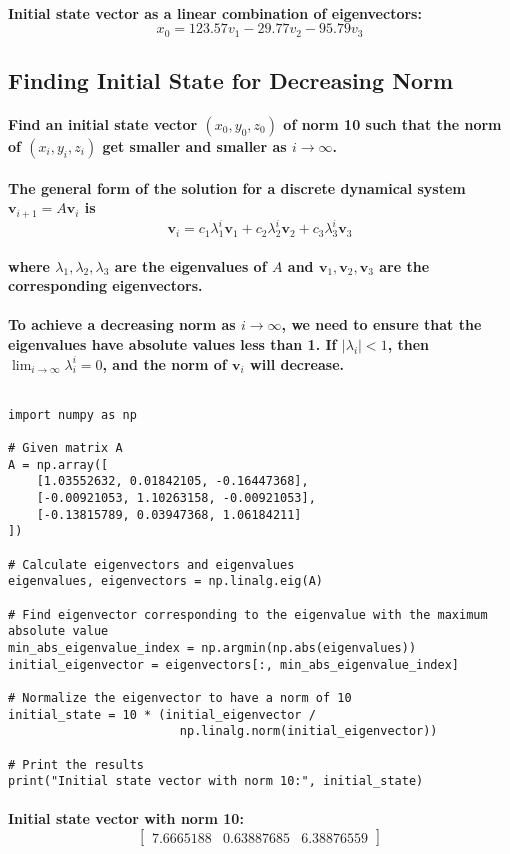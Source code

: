 \paragraph{\textbf{Initial state vector as a linear combination of eigenvectors:}$$ x_0 = 123.57 v_1 -29.77 v_2  -95.79 v_3 $$}
% 
% 
% 
% 
% 
% 
% 
% 
\subsection{Finding Initial State for Decreasing Norm}
\paragraph{Find an initial state vector $(x_0,y_0,z_0)$ of norm 10 such that the norm of $(x_i,y_i,z_i)$ get smaller and smaller as $i \rightarrow \infty$.}
% 
% 
% 
% 
\paragraph{The general form of the solution for a discrete dynamical system $\mathbf{v}_{i+1} = A \mathbf{v}_i $  is
    $$ \mathbf{v}_i = c_1 \lambda_1^i \mathbf{v}_1 + c_2 \lambda_2^i \mathbf{v}_2 + c_3 \lambda_3^i \mathbf{v}_3 $$}
% 
% 
%
% 
% 
\paragraph{where $ \lambda_1, \lambda_2, \lambda_3 $ are the eigenvalues of \(A\) and \(\mathbf{v}_1, \mathbf{v}_2, \mathbf{v}_3\) are the corresponding eigenvectors.}
% 
% 
% 
%
\paragraph{To achieve a decreasing norm as \(i \rightarrow \infty\), we need to ensure that the eigenvalues have absolute values less than 1. If \(|\lambda_i| < 1\), then \(\lim_{i \to \infty} \lambda_i^i = 0\), and the norm of \(\mathbf{v}_i\) will decrease.}
% 
% 
% 
%
$$$$
% 
% 
% 
% 
\begin{lstlisting}[style=pystyle]
import numpy as np

# Given matrix A
A = np.array([
    [1.03552632, 0.01842105, -0.16447368],
    [-0.00921053, 1.10263158, -0.00921053],
    [-0.13815789, 0.03947368, 1.06184211]
])

# Calculate eigenvectors and eigenvalues
eigenvalues, eigenvectors = np.linalg.eig(A)

# Find eigenvector corresponding to the eigenvalue with the maximum absolute value
min_abs_eigenvalue_index = np.argmin(np.abs(eigenvalues))
initial_eigenvector = eigenvectors[:, min_abs_eigenvalue_index]

# Normalize the eigenvector to have a norm of 10
initial_state = 10 * (initial_eigenvector /
                        np.linalg.norm(initial_eigenvector))

# Print the results
print("Initial state vector with norm 10:", initial_state)

\end{lstlisting}
% 
% 
% 
%
% 
% 
% 
%
\paragraph{\textbf{Initial state vector with norm 10:}
$$
\left[
    \begin{matrix}
        7.6665188 & 0.63887685 & 6.38876559
    \end{matrix}
    \right]
$$}
